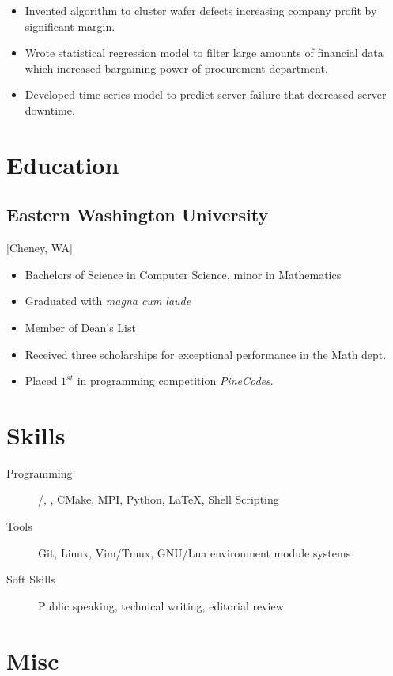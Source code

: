 \documentclass{mycv}
\begin{document}
\begin{itemize}
  \item Invented algorithm to cluster wafer defects increasing company profit by significant margin.
  \item Wrote statistical regression model to filter large amounts of financial data which increased bargaining power of procurement department.
  \item Developed time-series model to predict server failure that decreased server downtime.
\end{itemize}

\section{Education}

\subsection{Eastern Washington University}[Cheney, WA]
\vspace{-\parskip}%
\begin{itemize}[label={}]
  \item Bachelors of Science in Computer Science, minor in Mathematics 
  \item Graduated with \textit{magna cum laude}
  \item Member of Dean's List
  \item Received three scholarships for exceptional performance in the Math dept.
  \item Placed $1^{st}$ in programming competition \textit{PineCodes}. 
\end{itemize}

\section{Skills}

\begin{description}
  \item[Programming] \cee/\cpp, \cuda, CMake, MPI, Python, \LaTeX, Shell Scripting
  \item[Tools] Git, Linux, Vim/Tmux, GNU/Lua environment module systems
  \item[Soft Skills] Public speaking, technical writing, editorial review
\end{description}

\section{Misc}
\end{document}
